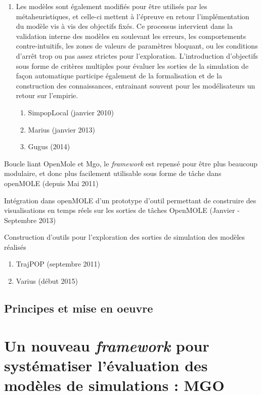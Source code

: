 \begin{myitemize2}
\begin{enumerate}
\item Les modèles sont également modifiés pour être utilisés par les métaheuristiques, et celle-ci mettent à l'épreuve en retour l'implémentation du modèle vis à vis des objectifs fixés. Ce processus intervient dans la validation interne des modèles en soulevant les erreurs, les comportements contre-intuitifs, les zones de valeurs de paramètres bloquant, ou les conditions d'arrêt trop ou pas assez strictes pour l'exploration. L'introduction d'objectifs sous forme de critères multiples pour évaluer les sorties de la simulation de façon automatique participe également de la formalisation et de la construction des connaissances, entrainant souvent pour les modélisateurs un retour sur l'empirie.
\begin{enumerate}
 \item SimpopLocal (janvier 2010)
 \item Marius (janvier 2013)
 \item Gugus (2014)
 \end{enumerate}
\end{enumerate}

\item[5] Boucle liant OpenMole et Mgo, le \textit{framework} est repensé pour être plus beaucoup modulaire, et donc plus facilement utilisable sous forme de tâche dans openMOLE (depuis Mai 2011)

\item[6] Intégration dans openMOLE d'un prototype d'outil permettant de construire des visualisations en temps réels sur les sorties de tâches OpenMOLE (Janvier - Septembre 2013)

\item[7]  Construction d'outils pour l'exploration des sorties de simulation des modèles réalisés
 \begin{enumerate}
 \item TrajPOP (septembre 2011)
 \item Varius (début 2015)
 \end{enumerate}

\end{myitemize2}


\subsection{Principes et mise en oeuvre}

\section{Un nouveau \textit{framework} pour systématiser l'évaluation des modèles de simulations : MGO}
\label{sec:MGO}

